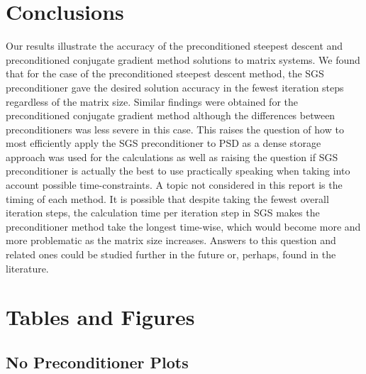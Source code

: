 \documentclass[11pt]{article}
\begin{document}
\section{Conclusions}

Our results illustrate the accuracy of the preconditioned steepest descent and preconditioned conjugate gradient method solutions to matrix systems. We found that for the case of the preconditioned steepest descent method, the SGS preconditioner gave the desired solution accuracy in the fewest iteration steps regardless of the matrix size. Similar findings were obtained for the preconditioned conjugate gradient method although the differences between preconditioners was less severe in this case. This raises the question of how to most efficiently apply the SGS preconditioner to PSD as a dense storage approach was used for the calculations as well as raising the question if SGS preconditioner is actually the best to use practically speaking when taking into account possible time-constraints. A topic not considered in this report is the timing of each method. It is possible that despite taking the fewest overall iteration steps, the calculation time per iteration step in SGS makes the preconditioner method take the longest time-wise, which would become more and more problematic as the matrix size increases. Answers to this question and related ones could be studied further in the future or, perhaps, found in the literature.

\clearpage

\section{Tables and Figures}
\subsection{No Preconditioner Plots}
\end{document}

